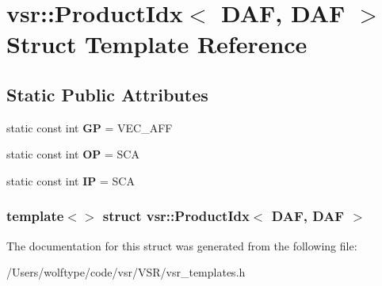 \hypertarget{structvsr_1_1_product_idx_3_01_d_a_f_00_01_d_a_f_01_4}{\section{vsr\-:\-:Product\-Idx$<$ D\-A\-F, D\-A\-F $>$ Struct Template Reference}
\label{structvsr_1_1_product_idx_3_01_d_a_f_00_01_d_a_f_01_4}
}
\subsection*{Static Public Attributes}
\begin{DoxyCompactItemize}
\item 
\hypertarget{structvsr_1_1_product_idx_3_01_d_a_f_00_01_d_a_f_01_4_a3863d9e68cbdb56f68e5bf645eda5a46}{static const int {\bfseries G\-P} = V\-E\-C\-\_\-\-A\-F\-F}\label{structvsr_1_1_product_idx_3_01_d_a_f_00_01_d_a_f_01_4_a3863d9e68cbdb56f68e5bf645eda5a46}

\item 
\hypertarget{structvsr_1_1_product_idx_3_01_d_a_f_00_01_d_a_f_01_4_a6b1e6111500666c52a95a2b4e860a917}{static const int {\bfseries O\-P} = S\-C\-A}\label{structvsr_1_1_product_idx_3_01_d_a_f_00_01_d_a_f_01_4_a6b1e6111500666c52a95a2b4e860a917}

\item 
\hypertarget{structvsr_1_1_product_idx_3_01_d_a_f_00_01_d_a_f_01_4_af990c8791deff0ce9545ad302b6eb5d9}{static const int {\bfseries I\-P} = S\-C\-A}\label{structvsr_1_1_product_idx_3_01_d_a_f_00_01_d_a_f_01_4_af990c8791deff0ce9545ad302b6eb5d9}

\end{DoxyCompactItemize}
\subsubsection*{template$<$$>$ struct vsr\-::\-Product\-Idx$<$ D\-A\-F, D\-A\-F $>$}



The documentation for this struct was generated from the following file\-:\begin{DoxyCompactItemize}
\item 
/\-Users/wolftype/code/vsr/\-V\-S\-R/vsr\-\_\-templates.\-h\end{DoxyCompactItemize}

